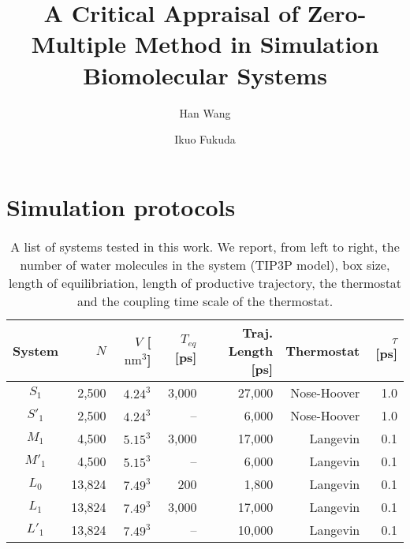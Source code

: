 \documentclass[aip,jcp,a4paper,reprint,unsortedaddress,onecolumn,fleqn]{revtex4-1}
\newcommand{\systemsb}{S_1}
\newcommand{\systemsbp}{S'_1}
\newcommand{\systemmb}{M_1}
\newcommand{\systemmbp}{M'_1}
\newcommand{\systemla}{L_0}
\newcommand{\systemlbp}{L'_1}
\newcommand{\systemlb}{L_1}
\begin{document}
\title{A Critical Appraisal of Zero-Multiple Method in Simulation Biomolecular Systems}
\author{Han Wang}
\author{Ikuo Fukuda}

\begin{abstract}
\end{abstract}

\maketitle

\section{Simulation protocols}

\begin{table}
  \centering
  \caption{A list of systems tested in this work. We report, from left to right, the number of water
    molecules in the system (TIP3P model), box size, length of equilibriation, length of productive trajectory, the thermostat and the coupling time scale of the thermostat.
    }
  \begin{tabular*}{0.9\textwidth}{@{\extracolsep{\fill}}c rrrrrr}\hline\hline
    System      & $N$ & $V$ [$\textrm{nm}^3$]  & $T_{eq}$ [ps] & Traj. Length [ps] & Thermostat & $\tau$ [ps]  \\\hline
    $\systemsb$          & 2,500          & $4.24^3$              & 3,000        & 27,000        & Nose-Hoover & 1.0 \\
    $\systemsbp$         &   2,500        & $4.24^3$              & --           &  6,000        & Nose-Hoover & 1.0\\
    $\systemmb$          & 4,500          & $5.15^3$              & 3,000        & 17,000        & Langevin & 0.1\\
    $\systemmbp$         &   4,500        & $5.15^3$              & --           &  6,000        & Langevin & 0.1\\
    $\systemla$          &   13,824       & $7.49^3$              & 200          & 1,800         & Langevin & 0.1\\
    $\systemlb$          &   13,824       & $7.49^3$              & 3,000        & 17,000        & Langevin & 0.1\\
    $\systemlbp$         &   13,824       & $7.49^3$              & --           & 10,000        & Langevin & 0.1\\
    \hline\hline
  \end{tabular*}
  \label{tab:tmp1}
\end{table}
\end{document}
